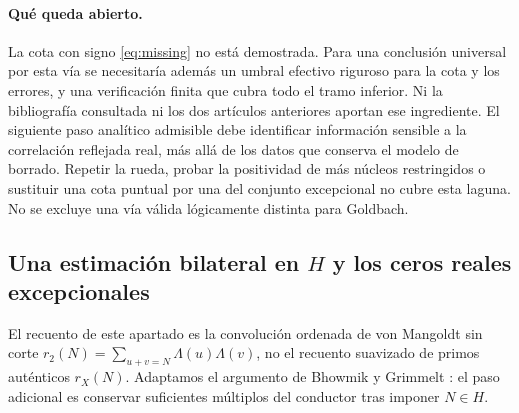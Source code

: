 \documentclass[11pt,a4paper]{article}
\newcommand{\B}[2]{#2}
\newcommand{\B}[2]{#1}
\begin{document}
\paragraph{\B{What remains open.}{Qué queda abierto.}}
\B{The signed bound \eqref{eq:missing} is not proved. A universal conclusion by this route would also require a rigorous effective cutoff for the bound and errors and a finite verification covering the entire range below it. The reviewed bibliography and the two earlier papers supply no such input. The next admissible analytic step must identify information sensitive to the true reflected prime correlation beyond the data preserved in the deletion model. Repeating the wheel calculation, proving positivity of more restricted cores, or replacing a pointwise estimate by an exceptional-set bound cannot fill this gap. A valid logically different route to Goldbach is not excluded.}{La cota con signo \eqref{eq:missing} no está demostrada. Para una conclusión universal por esta vía se necesitaría además un umbral efectivo riguroso para la cota y los errores, y una verificación finita que cubra todo el tramo inferior. Ni la bibliografía consultada ni los dos artículos anteriores aportan ese ingrediente. El siguiente paso analítico admisible debe identificar información sensible a la correlación reflejada real, más allá de los datos que conserva el modelo de borrado. Repetir la rueda, probar la positividad de más núcleos restringidos o sustituir una cota puntual por una del conjunto excepcional no cubre esta laguna. No se excluye una vía válida lógicamente distinta para Goldbach.}

\subsection{\B{A two-sided estimate on \texorpdfstring{$H$}{H} and exceptional real zeros}{Una estimación bilateral en \texorpdfstring{$H$}{H} y los ceros reales excepcionales}}
\B{The count in this subsection is the uncut ordered von Mangoldt convolution $r_2(N)=\sum_{u+v=N}\Lambda(u)\Lambda(v)$, not the smooth genuine-prime count $r_X(N)$. We adapt the argument of Bhowmik and Grimmelt \cite[Proposition 8.1 and Theorem 8.2]{bg}: the additional step is to retain enough conductor multiples after imposing $N\in H$.}{El recuento de este apartado es la convolución ordenada de von Mangoldt sin corte $r_2(N)=\sum_{u+v=N}\Lambda(u)\Lambda(v)$, no el recuento suavizado de primos auténticos $r_X(N)$. Adaptamos el argumento de Bhowmik y Grimmelt \cite[Proposición 8.1 y Teorema 8.2]{bg}: el paso adicional es conservar suficientes múltiplos del conductor tras imponer $N\in H$.}
\end{document}
